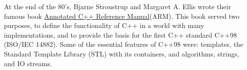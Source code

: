 
At the end of the 80’s, Bjarne Stroustrup and Margaret A. Ellis wrote their famous book \href{https://www.stroustrup.com/arm.html}{Annotated C++ Reference Manual}(ARM). This book served two purposes, to define the functionality of C++ in a world with many implementations, and to provide the basis for the first C++ standard C++98 (ISO/IEC 14882). Some of the essential features of C++98 were: templates, the Standard Template Library (STL) with its containers, and algorithms, strings, and IO streams.
